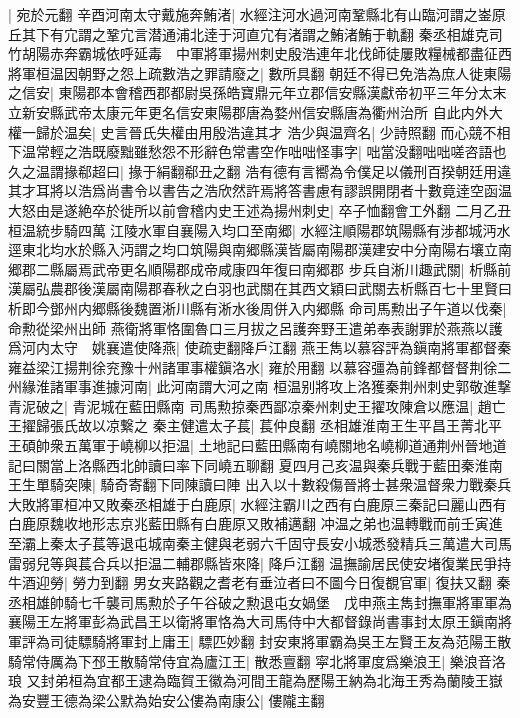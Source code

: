 |{
	宛於元翻}
辛酉河南太守戴施奔鮪渚|{
	水經注河水過河南鞏縣北有山臨河謂之崟原丘其下有宂謂之鞏宂言潜通浦北逹于河直宂有渚謂之鮪渚鮪于軌翻}
秦丞相雄克司竹胡陽赤奔霸城依呼延毒　中軍將軍揚州刺史殷浩連年北伐師徒屢敗糧械都盡征西將軍桓温因朝野之怨上疏數浩之罪請廢之|{
	數所具翻}
朝廷不得已免浩為庶人徙東陽之信安|{
	東陽郡本會稽西郡都尉吳孫皓寶鼎元年立郡信安縣漢獻帝初平三年分太末立新安縣武帝太康元年更名信安東陽郡唐為婺州信安縣唐為衢州治所}
自此内外大權一歸於温矣|{
	史言晉氏失權由用殷浩違其才}
浩少與温齊名|{
	少詩照翻}
而心競不相下温常輕之浩既廢黜雖愁怨不形辭色常書空作咄咄怪事字|{
	咄當没翻咄咄嗟咨語也}
久之温謂掾郗超曰|{
	掾于絹翻郗丑之翻}
浩有德有言嚮為令僕足以儀刑百揆朝廷用違其才耳將以浩爲尚書令以書告之浩欣然許焉將答書慮有謬誤開閉者十數竟逹空函温大怒由是遂絶卒於徙所以前會稽内史王述為揚州刺史|{
	卒子恤翻會工外翻}
二月乙丑桓温統步騎四萬江陵水軍自襄陽入均口至南郷|{
	水經注順陽郡筑陽縣有涉都城沔水逕東北均水於縣入沔謂之均口筑陽與南郷縣漢皆屬南陽郡漢建安中分南陽右壤立南郷郡二縣屬焉武帝更名順陽郡成帝咸康四年復曰南郷郡}
步兵自淅川趣武關|{
	析縣前漢屬弘農郡後漢屬南陽郡春秋之白羽也武關在其西文穎曰武關去析縣百七十里賢曰析即今鄧州内郷縣後魏置淅川縣有淅水後周併入内郷縣}
命司馬勲出子午道以伐秦|{
	命勲從梁州出師}
燕衛將軍恪圍魯口三月拔之呂護奔野王遣弟奉表謝罪於燕燕以護爲河内太守　姚襄遣使降燕|{
	使疏吏翻降戶江翻}
燕王雋以慕容評為鎭南將軍都督秦雍益梁江揚荆徐兖豫十州諸軍事權鎭洛水|{
	雍於用翻}
以慕容彊為前鋒都督督荆徐二州緣淮諸軍事進據河南|{
	此河南謂大河之南}
桓温别將攻上洛獲秦荆州刺史郭敬進撃青泥破之|{
	青泥城在藍田縣南}
司馬勲掠秦西鄙凉秦州刺史王擢攻陳倉以應温|{
	趙亡王擢歸張氏故以凉繋之}
秦主健遣太子萇|{
	萇仲良翻}
丞相雄淮南王生平昌王菁北平王碩帥衆五萬軍于嶢柳以拒温|{
	土地記曰藍田縣南有嶢關地名嶢柳道通荆州晉地道記曰關當上洛縣西北帥讀曰率下同嶢五聊翻}
夏四月己亥温與秦兵戰于藍田秦淮南王生單騎突陳|{
	騎奇寄翻下同陳讀曰陣}
出入以十數殺傷晉將士甚衆温督衆力戰秦兵大敗將軍桓冲又敗秦丞相雄于白鹿原|{
	水經注霸川之西有白鹿原三秦記曰麗山西有白鹿原魏收地形志京兆藍田縣有白鹿原又敗補邁翻}
冲温之弟也温轉戰而前壬寅進至灞上秦太子萇等退屯城南秦主健與老弱六千固守長安小城悉發精兵三萬遣大司馬雷弱兒等與萇合兵以拒温二輔郡縣皆來降|{
	降戶江翻}
温撫諭居民使安堵復業民爭持牛酒迎勞|{
	勞力到翻}
男女夹路觀之耆老有垂泣者曰不圖今日復覩官軍|{
	復扶又翻}
秦丞相雄帥騎七千襲司馬勲於子午谷破之勲退屯女媧堡　戊申燕主雋封撫軍將軍軍為襄陽王左將軍彭為武昌王以衛將軍恪為大司馬侍中大都督錄尚書事封太原王鎭南將軍評為司徒驃騎將軍封上庸王|{
	驃匹妙翻}
封安東將軍霸為吳王左賢王友為范陽王散騎常侍厲為下邳王散騎常侍宜為廬江王|{
	散悉亶翻}
寜北將軍度爲樂浪王|{
	樂浪音洛琅}
又封弟桓為宜都王逮為臨賀王徽為河間王龍為歷陽王納為北海王秀為蘭陵王嶽為安豐王德為梁公默為始安公僂為南康公|{
	僂隴主翻}
